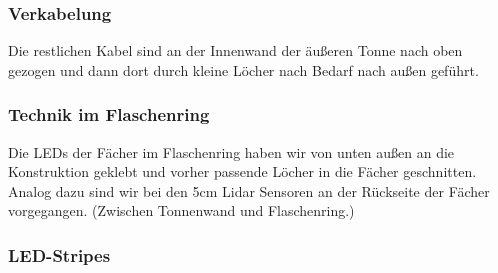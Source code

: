     \subsubsection{Verkabelung}

        Die restlichen Kabel sind an der Innenwand der äußeren Tonne nach oben gezogen und dann dort durch kleine Löcher nach Bedarf nach außen geführt.


    \subsubsection{Technik im Flaschenring}

        Die LEDs der Fächer im Flaschenring haben wir von unten außen an die Konstruktion geklebt und vorher passende Löcher in die Fächer geschnitten. Analog dazu sind wir bei den 5cm Lidar Sensoren an der Rückseite der Fächer vorgegangen. (Zwischen Tonnenwand und Flaschenring.)

    \subsubsection{LED-Stripes}

